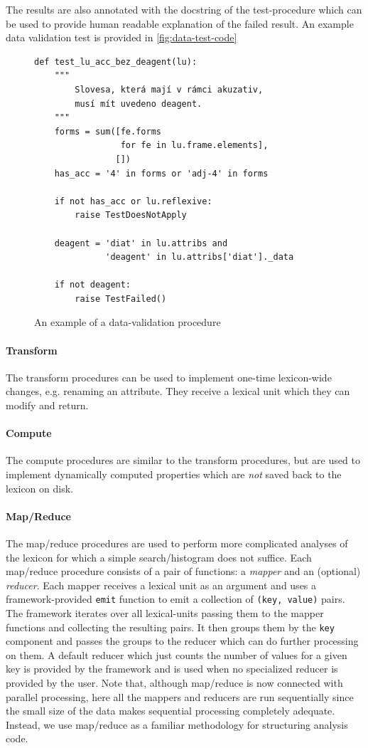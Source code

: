 \documentclass[10pt, a4paper]{article}
\newcommand{\py}[1]{{\tt #1}}
\begin{document}
The results are also annotated with the docstring of the test-procedure which can be used to provide human
readable explanation of the failed result. An example data validation test is provided in \autoref{fig:data-test-code}
\begin{figure}
\begin{verbatim}
def test_lu_acc_bez_deagent(lu):
    """
        Slovesa, která mají v rámci akuzativ,
        musí mít uvedeno deagent.
    """
    forms = sum([fe.forms
                 for fe in lu.frame.elements],
                [])
    has_acc = '4' in forms or 'adj-4' in forms

    if not has_acc or lu.reflexive:
        raise TestDoesNotApply

    deagent = 'diat' in lu.attribs and
              'deagent' in lu.attribs['diat']._data

    if not deagent:
        raise TestFailed()
\end{verbatim}
\caption{\label{fig:data-test-code}An example of a data-validation procedure}
\end{figure}

\paragraph{Transform} The transform procedures can be used to implement one-time lexicon-wide changes, e.g.
renaming an attribute. They receive a lexical unit which they can modify and return.

\paragraph{Compute} The compute procedures are similar to the transform procedures, but are used to implement dynamically computed properties which are \emph{not} saved back to the lexicon on disk.

\paragraph{Map/Reduce} The map/reduce procedures are used to perform more complicated analyses of the lexicon
for which a simple search/histogram does not suffice. Each map/reduce procedure consists of a pair of functions:
a \emph{mapper} and an (optional) \emph{reducer}. Each mapper receives a lexical unit as an argument and
uses a framework-provided \py{emit} function to emit a collection of \py{(key, value)} pairs. The framework
iterates over all lexical-units passing them to the mapper functions and collecting the resulting pairs. It then groups them by the \py{key} component and passes the groups to the reducer which can do further processing on them.
A default reducer which just counts the number of values for a given key is provided by the framework and is
used when no specialized reducer is provided by the user. Note that, although map/reduce is now connected with
parallel processing, here all the mappers and reducers are run sequentially since the small size of the data makes
sequential processing completely adequate. Instead, we use map/reduce as a familiar methodology for structuring
analysis code.
\end{document}
